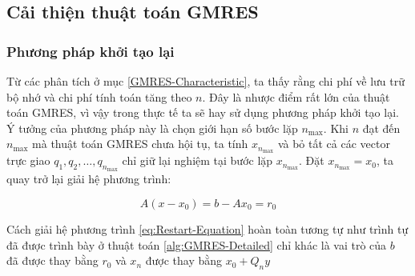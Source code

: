 \documentclass[14pt, a4paper]{article}
\numberwithin{equation}{section}
\numberwithin{algorithm}{section}
\numberwithin{figure}{section}
\numberwithin{dl}{section}
\numberwithin{md}{section}
\numberwithin{bd}{section}
\numberwithin{dn}{section}
\begin{document}
\subsection{Cải thiện thuật toán GMRES}

\subsubsection{Phương pháp khởi tạo lại}

Từ các phân tích ở mục \ref{GMRES-Characteristic}, ta thấy rằng chi phí về lưu trữ bộ nhớ và chi phí tính toán tăng theo $n$. Đây là nhược điểm rất lớn của thuật toán GMRES, vì vậy trong thực tế ta sẽ hay sử dụng phương pháp khởi tạo lại.
Ý tưởng của phương pháp này là chọn giới hạn số bước lặp $n_{\max}$. Khi $n$ đạt đến $n_{\max}$ mà thuật toán GMRES chưa hội tụ, ta tính $x_{n_{\max}}$ và bỏ tất cả các vector trực giao $q_1, q_2, \dots, q_{n_{\max}}$ chỉ giữ lại nghiệm tại bước lặp $x_{n_{\max}}$. Đặt $x_{n_{\max}}=x_0$, ta quay trở lại giải hệ phương trình:

\begin{equation} \label{eq:Restart-Equation}
    A(x - x_0) = b - A x_0 = r_0
\end{equation}

Cách giải hệ phương trình \ref{eq:Restart-Equation} hoàn toàn tương tự như trình tự đã được trình bày ở thuật toán \ref{alg:GMRES-Detailed} chỉ khác là vai trò của $b$ đã được thay bằng $r_0$ và $x_n$ được thay bằng $x_0+Q_n y$
\end{document}
